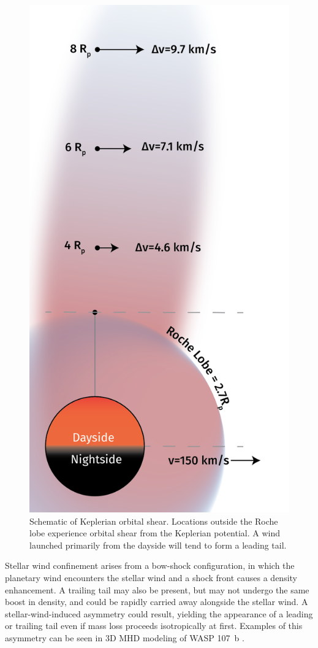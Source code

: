 \documentclass[twocolumn]{aastex631}
\begin{document}
\begin{figure}
    \includegraphics[width=0.8\linewidth]{figures/KeplerianShear_v0p3.png}
    \caption{Schematic of Keplerian orbital shear.  Locations outside the Roche lobe experience orbital shear from the Keplerian potential.  A wind launched primarily from the dayside will tend to form a leading tail.}
    \label{fig:KeplerianShear}
\end{figure}


Stellar wind confinement \citep{2022ApJ...926..226M} arises from a bow-shock configuration, in which the planetary wind encounters the stellar wind and a shock front causes a density enhancement.  A trailing tail may also be present, but may not undergo the same boost in density, and could be rapidly carried away alongside the stellar wind.  A stellar-wind-induced asymmetry could result, yielding the appearance of a leading or trailing tail even if mass loss proceeds isotropically at first. Examples of this asymmetry can be seen in 3D MHD modeling of WASP 107~b \citep{2022ApJ...926..226M}.
\end{document}
